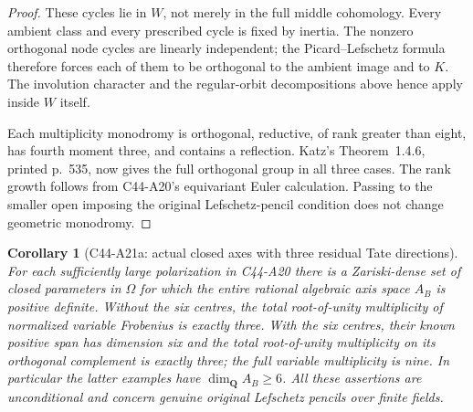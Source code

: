 \documentclass[11pt]{article}
\newtheorem{corollary}[theorem]{Corollary}
\theoremstyle{remark}\newtheorem{remark}[theorem]{Remark}
\begin{document}
\begin{proof}
These cycles lie in $W$, not merely in the full middle cohomology.
Every ambient class and every prescribed cycle is fixed by inertia.
The nonzero orthogonal node cycles are linearly independent; the
Picard--Lefschetz formula therefore forces each of them to be orthogonal
to the ambient image and to $K$.  The involution character and the
regular-orbit decompositions above hence apply inside $W$ itself.

Each multiplicity monodromy is orthogonal, reductive, of rank greater
than eight, has fourth moment three, and contains a reflection.
Katz's Theorem~1.4.6, printed p.~535, now gives the full orthogonal group
in all three cases.  The rank growth follows from C44-A20's equivariant
Euler calculation.  Passing to the smaller open imposing the original
Lefschetz-pencil condition does not change geometric monodromy.
\end{proof}

\begin{corollary}[C44-A21a: actual closed axes with three residual Tate directions]
For each sufficiently large polarization in C44-A20 there is a
Zariski-dense set of closed parameters in $\Omega$ for which the entire
rational algebraic axis space $A_B$ is positive definite.  Without the
six centres, the total root-of-unity multiplicity of normalized variable
Frobenius is exactly three.  With the six centres, their known positive
span has dimension six and the total root-of-unity multiplicity on its
orthogonal complement is exactly three; the full variable multiplicity
is nine.  In particular the latter examples have $\dim_{\mathbf Q}A_B\geq6$.
All these assertions are unconditional and concern genuine original
Lefschetz pencils over finite fields.
\end{corollary}
\end{document}
